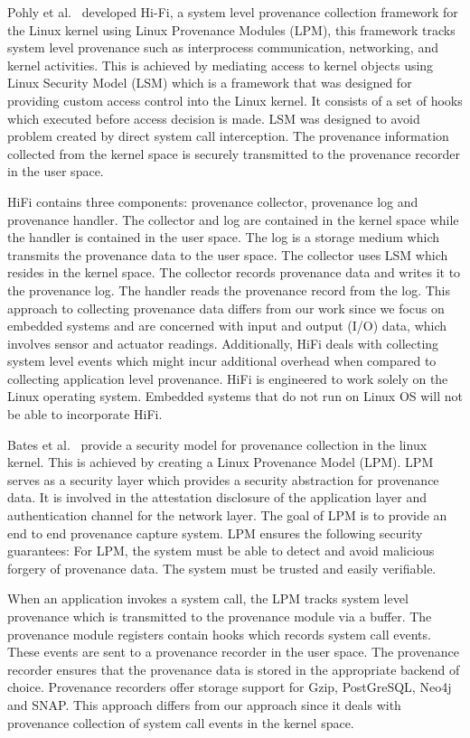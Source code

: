 Pohly et al.~\cite{hi_fi}  developed Hi-Fi, a system level provenance collection framework for the Linux kernel using Linux Provenance Modules (LPM), this framework tracks system level provenance such as interprocess communication, networking, and kernel activities. This is achieved by mediating access to kernel objects using Linux Security Model (LSM) which is a framework that was designed for providing custom access control into the Linux kernel. It consists of a set of hooks which executed before access decision is made. LSM was designed to avoid problem created by direct system call interception. The provenance information collected from the kernel space is securely transmitted to the provenance recorder in the user space. 
\par HiFi contains three components: provenance collector, provenance log and provenance handler. The collector and log are contained in the kernel space while the handler is contained in the user space. The log is a storage medium which transmits the provenance data to the user space. The collector uses LSM which resides in the kernel space. The collector records provenance data and writes it to the provenance log. The handler reads the provenance record from the log. This approach to collecting provenance data differs from our work since we focus on embedded systems and are concerned with input and output (I/O) data, which involves sensor and actuator readings. Additionally,  HiFi deals with collecting system level events which might incur additional overhead when compared to collecting application level provenance. HiFi is engineered to work solely on the Linux operating system. Embedded systems that do not run on Linux OS will not be able to incorporate HiFi. 

Bates et al.~\cite{bates_towards_2013} provide a security model for provenance collection in the linux kernel. This is achieved by creating a Linux Provenance Model (LPM). LPM serves as a security layer which provides a security abstraction for provenance data. It is involved in the attestation disclosure of the application layer and authentication channel for the network layer. The goal of LPM is to provide an end to end provenance capture system. LPM ensures the following security guarantees: For LPM, the system must be able to detect and avoid malicious forgery of provenance data. The system must be trusted and easily verifiable. \par When an application invokes a system call, the LPM tracks system level provenance which is transmitted to the provenance module via a buffer. The provenance module registers contain hooks which records system call events. These events are sent to a provenance recorder in the user space. The provenance recorder ensures that the provenance data is stored in the appropriate backend of choice. Provenance recorders offer storage support for Gzip, PostGreSQL, Neo4j and SNAP. This approach differs from our approach since it deals with provenance collection of system call events in the kernel space.

